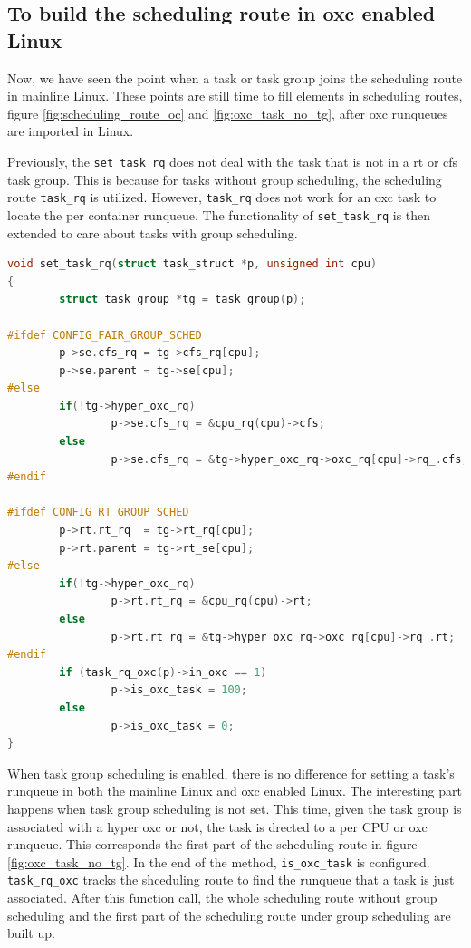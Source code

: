 \subsection{To build the scheduling route in oxc enabled Linux}
Now, we have seen the point when a task or task group joins the scheduling 
route in mainline Linux. These points are still time to fill elements in 
scheduling routes, figure \ref{fig:scheduling_route_oc} and 
\ref{fig:oxc_task_no_tg}, after oxc runqueues are imported in Linux.

Previously, the \texttt{set\_task\_rq} does not deal with the task that is
not in a rt or cfs task group. This is because for tasks without group
scheduling, the scheduling route \texttt{task\_rq} is utilized.
However, \texttt{task\_rq} does not work for an oxc task to locate the
per container runqueue. The functionality of \texttt{set\_task\_rq} is
then extended to care about tasks with group scheduling. 
\begin{lstlisting}[language=C, 
        caption={The extended \texttt{set\_task\_rq}}]
void set_task_rq(struct task_struct *p, unsigned int cpu)
{
        struct task_group *tg = task_group(p);

#ifdef CONFIG_FAIR_GROUP_SCHED
        p->se.cfs_rq = tg->cfs_rq[cpu];
        p->se.parent = tg->se[cpu];
#else
        if(!tg->hyper_oxc_rq)
                p->se.cfs_rq = &cpu_rq(cpu)->cfs;
        else
                p->se.cfs_rq = &tg->hyper_oxc_rq->oxc_rq[cpu]->rq_.cfs;
#endif

#ifdef CONFIG_RT_GROUP_SCHED
        p->rt.rt_rq  = tg->rt_rq[cpu];
        p->rt.parent = tg->rt_se[cpu];
#else
        if(!tg->hyper_oxc_rq)
                p->rt.rt_rq = &cpu_rq(cpu)->rt;
        else
                p->rt.rt_rq = &tg->hyper_oxc_rq->oxc_rq[cpu]->rq_.rt;
#endif
        if (task_rq_oxc(p)->in_oxc == 1)
                p->is_oxc_task = 100;
        else
                p->is_oxc_task = 0;
}
\end{lstlisting}
                                                  
When task group scheduling is enabled, there is no difference for setting a 
task's runqueue in both
the mainline Linux and oxc enabled Linux. The interesting part happens when 
task group scheduling is not set. This time, given the task group is associated
with a hyper oxc or not, the task is drected to a per CPU or oxc runqueue. This 
corresponds the first part of the scheduling route in figure 
\ref{fig:oxc_task_no_tg}. In the end of the method, \texttt{is\_oxc\_task} is 
configured. 
\texttt{task\_rq\_oxc} tracks the shceduling route to find the runqueue that
a task is just associated.
After this function call, the whole scheduling route without group scheduling
and the first part of the scheduling route under group scheduling are built up.

